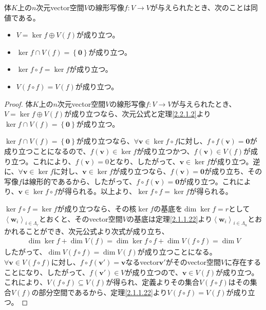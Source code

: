 \documentclass[dvipdfmx]{jsarticle}
\begin{document}
\begin{thm}\label{2.2.1.12}
体$K$上の$n$次元vector空間$V$の線形写像$f:V \rightarrow V$が与えられたとき、次のことは同値である。
\begin{itemize}
\item
  $V = \ker f \oplus V(f)$が成り立つ。
\item
  $\ker f \cap V(f) = \left\{ \mathbf{0} \right\}$が成り立つ。
\item
  $\ker{f \circ f} = \ker f$が成り立つ。
\item
  $V(f \circ f) = V(f)$が成り立つ。
\end{itemize}
\end{thm}
\begin{proof}
体$K$上の$n$次元vector空間$V$の線形写像$f:V \rightarrow V$が与えられたとき、$V = \ker f \oplus V(f)$が成り立つなら、次元公式と定理\ref{2.2.1.2}より$\ker f \cap V(f) = \left\{ \mathbf{0} \right\}$が成り立つ。\par
$\ker f \cap V(f) = \left\{ \mathbf{0} \right\}$が成り立つなら、$\forall\mathbf{v} \in \ker{f \circ f}$に対し、$f \circ f\left( \mathbf{v} \right) = \mathbf{0}$が成り立つことになるので、$f\left( \mathbf{v} \right) \in \ker f$が成り立つかつ、$f\left( \mathbf{v} \right) \in V(f)$が成り立つ。これにより、$f\left( \mathbf{v} \right) = 0$となり、したがって、$\mathbf{v} \in \ker f$が成り立つ。逆に、$\forall\mathbf{v} \in \ker f$に対し、$\mathbf{v} \in \ker f$が成り立つなら、$f\left( \mathbf{v} \right) = \mathbf{0}$が成り立ち、その写像$f$は線形的であるから、したがって、$f \circ f\left( \mathbf{v} \right) = \mathbf{0}$が成り立つ。これにより、$\mathbf{v} \in \ker{f \circ f}$が得られる。以上より、$\ker{f \circ f} = \ker f$が得られる。\par
$\ker{f \circ f} = \ker f$が成り立つなら、その核$\ker f$の基底を$\dim{\ker f} = r$として$\left\langle \mathbf{w}_{i} \right\rangle_{i \in \varLambda_{r}}$とおくと、そのvector空間$V$の基底は定理\ref{2.1.1.22}より$\left\langle \mathbf{w}_{i} \right\rangle_{i \in \varLambda_{n}}$とおかれることができ、次元公式より次式が成り立ち、
\begin{align*}
\dim{\ker f} + \dim{V(f)} = \dim{\ker{f \circ f}} + \dim{V(f \circ f)} = \dim V
\end{align*}
したがって、$\dim{V(f \circ f)} = \dim{V(f)}$が成り立つことになる。$\forall\mathbf{v} \in V(f \circ f)$に対し、$f \circ f\left( \mathbf{v}' \right) = \mathbf{v}$なるvector$\mathbf{v}'$がそのvector空間$V$に存在することになり、したがって、$f\left( \mathbf{v}' \right) \in V$が成り立つので、$\mathbf{v} \in V(f)$が成り立つ。これにより、$V(f \circ f) \subseteq V(f)$が得られ、定義よりその集合$V(f \circ f)$はその集合$V(f)$の部分空間であるから、定理\ref{2.1.1.22}より$V(f \circ f) = V(f)$が成り立つ。\par

\end{proof}
\end{document}
